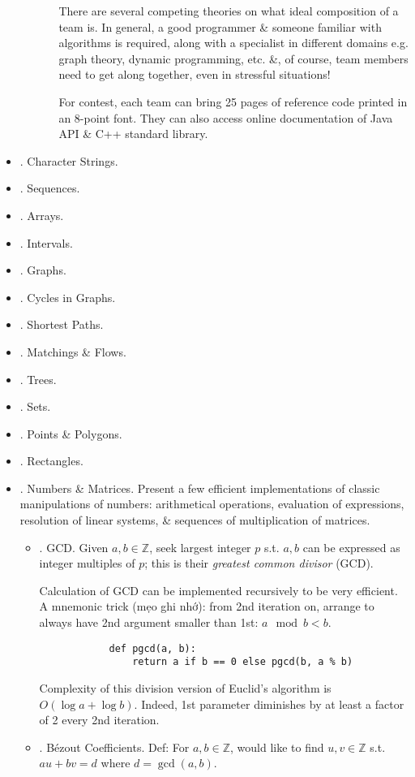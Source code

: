 \documentclass{article}
\begin{document}
\begin{itemize}
\begin{itemize}
\begin{itemize}
			There are several competing theories on what ideal composition of a team is. In general, a good programmer \& someone familiar with algorithms is required, along with a specialist in different domains e.g. graph theory, dynamic programming, etc. \&, of course, team members need to get along together, even in stressful situations!
			
			For contest, each team can bring 25 pages of reference code printed in an 8-point font. They can also access online documentation of Java API \& C++ standard library.
		\end{itemize}
	\end{itemize}
	\item {. Character Strings.}
	\item {. Sequences.}
	\item {. Arrays.}
	\item {. Intervals.}
	\item {. Graphs.}
	\item {. Cycles in Graphs.}
	\item {. Shortest Paths.}
	\item {. Matchings \& Flows.}
	\item {. Trees.}
	\item {. Sets.}
	\item {. Points \& Polygons.}
	\item {. Rectangles.}
	\item {. Numbers \& Matrices.} Present a few efficient implementations of classic manipulations of numbers: arithmetical operations, evaluation of expressions, resolution of linear systems, \& sequences of multiplication of matrices.
	\begin{itemize}
		\item {. GCD.} Given $a,b\in\mathbb{Z}$, seek largest integer $p$ s.t. $a,b$ can be expressed as integer multiples of $p$; this is their {\it greatest common divisor} (GCD).
		
		Calculation of GCD can be implemented recursively to be very efficient. A mnemonic trick (mẹo ghi nhớ): from 2nd iteration on, arrange to always have 2nd argument smaller than 1st: $a\mod b < b$.
		\begin{verbatim}
			def pgcd(a, b):
			    return a if b == 0 else pgcd(b, a % b)
		\end{verbatim}
		Complexity of this division version of Euclid's algorithm is $O(\log a + \log b)$. Indeed, 1st parameter diminishes by at least a factor of 2 every 2nd iteration.
		\item {. B\'ezout Coefficients.} Def: For $a,b\in\mathbb{Z}$, would like to find $u,v\in\mathbb{Z}$ s.t. $au + bv = d$ where $d = \gcd(a,b)$.
		

\end{itemize}
\end{itemize}
\end{document}
